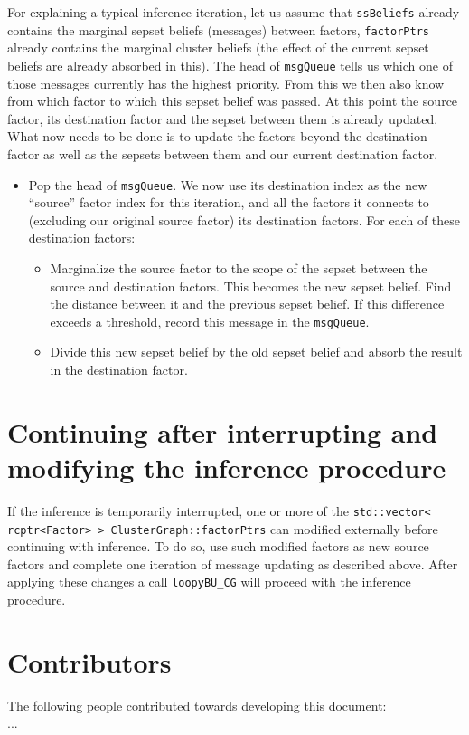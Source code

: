 \documentclass[oneside,english]{scrbook}
\begin{document}
For explaining a typical inference iteration, let us assume that
\texttt{ssBeliefs} already contains the marginal sepset beliefs
(messages) between factors, \texttt{factorPtrs} already contains the
marginal cluster beliefs (the effect of the current sepset beliefs are
already absorbed in this). The head of \texttt{msgQueue} tells us
which one of those messages currently has the highest priority. From
this we then also know from which factor to which this sepset belief
was passed. At this point the source factor, its destination factor
and the sepset between them is already updated. What now needs to be
done is to update the factors beyond the destination factor as well as
the sepsets between them and our current destination factor.
\begin{itemize}
\item Pop the head of \texttt{msgQueue}. We now use its destination
  index as the new ``source'' factor index for this iteration, and
  all the factors it connects to (excluding our original source
  factor) its destination factors. For each of these destination
  factors:
  \begin{itemize}
  \item Marginalize the source factor to the scope of the sepset
    between the source and destination factors. This becomes the new
    sepset belief. Find the distance between it and the previous
    sepset belief. If this difference exceeds a threshold, record
    this message in the \texttt{msgQueue}.
  \item Divide this new sepset belief by the old sepset belief and
    absorb the result in the destination factor.
  \end{itemize}

\end{itemize}


\section{Continuing after interrupting and modifying the inference procedure}
If the inference is temporarily interrupted, one or more of the
\texttt{std::vector< rcptr<Factor> > ClusterGraph::factorPtrs} can
modified externally before continuing with inference. To do so, use
such modified factors as new source factors and complete one iteration
of message updating as described above. After applying these changes a
call \texttt{loopyBU\_CG} will proceed with the inference procedure.

\pagebreak

\section*{Contributors}
The following people contributed towards developing this
document:\\ ...




\end{document}
